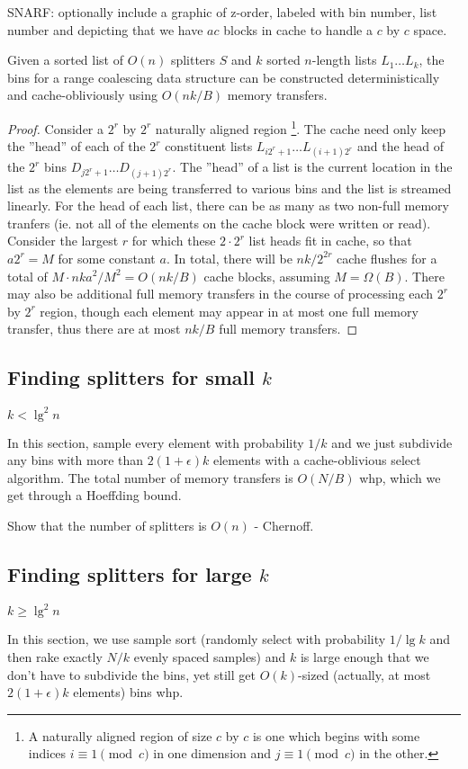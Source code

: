 SNARF: optionally include a graphic of z-order, labeled with bin number, list number
and depicting that we have $ac$ blocks in cache to handle a $c$ by $c$ space.

\begin{theorem}
Given a sorted list of $O(n)$ splitters $S$ and $k$ sorted $n$-length lists 
$L_1 \ldots L_k$, the bins for a range coalescing data structure can be constructed
deterministically and cache-obliviously using $O(nk/B)$ memory transfers.
\end{theorem}

\begin{proof}
Consider a $2^r$ by $2^r$ naturally aligned region \footnote{A naturally aligned region
of size $c$ by $c$ is one which begins with some indices $i \equiv 1 \pmod{c}$ 
in one dimension and $j \equiv 1 \pmod{c}$ in the other.}.  
The cache need only keep the ''head'' of each of the $2^r$ constituent
lists $L_{i2^r + 1} \ldots L_{(i+1)2^r}$ and the head of the $2^r$ bins 
$D_{j2^r + 1} \ldots D_{(j+1)2^r}$. The ''head'' of a list is the current location
in the list as the elements are being transferred to various bins and the list
is streamed linearly.  For the head of each list, there can be as many as
two non-full memory tranfers (ie. not all of the elements on the cache block were
written or read).  Consider the largest $r$ for which these $2 \cdot 2^r$ list heads
fit in cache, so that $a2^r = M$ for some constant $a$.  In total, there will be 
$nk/2^{2r}$ cache flushes for a total of $M \cdot nka^2/M^2 = O(nk/B)$ cache blocks, 
assuming $M = \Omega(B)$.  There may also be additional full memory transfers in the
course of processing each $2^r$ by $2^r$ region, though
each element may appear in at most one full memory transfer, thus there are at most
$nk/B$ full memory transfers.  
\end{proof}

\subsection*{Finding splitters for small $k$}

$k < \lg^2 n$

In this section, sample every element with probability $1/k$ and we just subdivide any bins
with more than $2(1+\epsilon)k$ elements with a cache-oblivious select algorithm.
The total number of memory transfers is $O(N/B)$ whp, which we get through a Hoeffding
bound.

Show that the number of splitters is $O(n)$ - Chernoff.

\subsection*{Finding splitters for large $k$}

$k \geq \lg ^2 n$

In this section, we use sample sort (randomly select with probability $1/\lg k$ and
then rake exactly $N/k$ evenly spaced samples) and $k$ is large enough that we don't have
to subdivide the bins, yet still get $O(k)$-sized (actually, at most 
$2(1+\epsilon)k$ elements) bins whp.  



